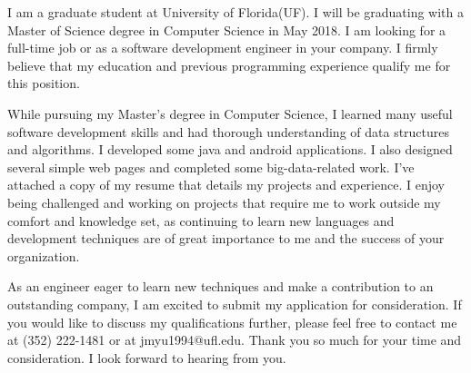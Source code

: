 \documentclass[11pt, a4paper]{awesome-cv}
\begin{document}
\makecvheader

\makelettertitle

\begin{cvletter}
I am a graduate student at University of Florida(UF). I will be graduating with a Master of Science degree in Computer Science in May 2018. I am looking for a full-time job or as a software development engineer in your company. I firmly believe that my education and previous programming experience qualify me for this position.
	
While pursuing my Master's degree in Computer Science, I learned many useful software development skills and had thorough understanding of data structures and algorithms. I developed some java and android applications. I also designed several simple web pages and completed some big-data-related work. I’ve attached a copy of my resume that details my projects and experience. I enjoy being challenged and working on projects that require me to work outside my comfort and knowledge set, as continuing to learn new languages and development techniques are of great importance to me and the success of your organization. 

As an engineer eager to learn new techniques and make a contribution to an outstanding company, I am excited to submit my application for consideration. If you would like to discuss my qualifications further, please feel free to contact me at (352) 222-1481 or at jmyu1994@ufl.edu. Thank you so much for your time and consideration. I look forward to hearing from you.

\end{cvletter}

\makeletterclosing
\end{document}
